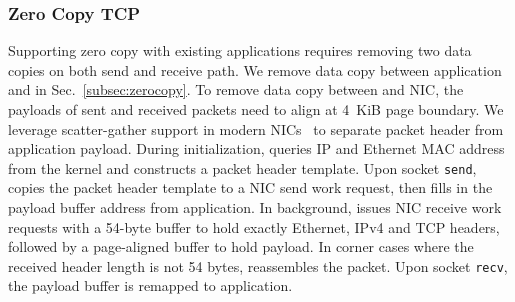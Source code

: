 \subsubsection{Zero Copy TCP}
\label{subsec:zero-copy-tcp}

Supporting zero copy with existing applications requires removing two data copies on both send and receive path. We remove data copy between application and \libipc{} in Sec.~\ref{subsec:zerocopy}. To remove data copy between \libipc{} and NIC, the payloads of sent and received packets need to align at 4~KiB page boundary. We leverage scatter-gather support in modern NICs~\cite{mellanox} to separate packet header from application payload. During initialization, \libipc{} queries IP and Ethernet MAC address from the kernel and constructs a packet header template. Upon socket \texttt{send}, \libipc{} copies the packet header template to a NIC send work request, then fills in the payload buffer address from application. In background, \libipc{} issues NIC receive work requests with a 54-byte buffer to hold exactly Ethernet, IPv4 and TCP headers, followed by a page-aligned buffer to hold payload. In corner cases where the received header length is not 54 bytes, \libipc{} reassembles the packet. Upon socket \texttt{recv}, the payload buffer is remapped to application.







